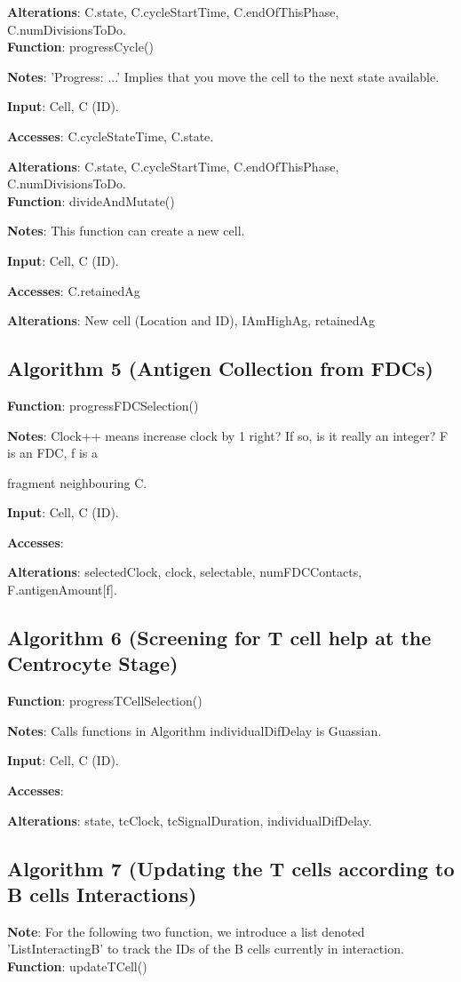 \documentclass[english]{article}
\begin{document}
\textbf{Alterations}: C.state, C.cycleStartTime, C.endOfThisPhase, C.numDivisionsToDo. 
\\
\textbf{Function}: progressCycle()

\textbf{Notes}: 'Progress: ...' Implies that you move the cell to the next state available. 

\textbf{Input}: Cell, C (ID). 

\textbf{Accesses}: C.cycleStateTime, C.state. 

\textbf{Alterations}: C.state, C.cycleStartTime, C.endOfThisPhase, C.numDivisionsToDo. 
\\
\textbf{Function}: divideAndMutate()

\textbf{Notes}: This function can create a new cell. 

\textbf{Input}: Cell, C (ID). 

\textbf{Accesses}: C.retainedAg

\textbf{Alterations}: New cell (Location and ID), IAmHighAg, retainedAg

\subsection{Algorithm 5 (Antigen Collection from FDCs)}
\textbf{Function}: progressFDCSelection()

\textbf{Notes}: Clock++ means increase clock by 1 right? If so, is it really an integer? F is an FDC, f is a 

fragment neighbouring C. 

\textbf{Input}: Cell, C (ID). 

\textbf{Accesses}: 

\textbf{Alterations}: selectedClock, clock, selectable, numFDCContacts,  F.antigenAmount[f]. 

\subsection{Algorithm 6 (Screening for T cell help at the Centrocyte Stage)}
\textbf{Function}: progressTCellSelection()

\textbf{Notes}: Calls functions in Algorithm individualDifDelay is Guassian.

\textbf{Input}: Cell, C (ID). 

\textbf{Accesses}:

\textbf{Alterations}: state, tcClock, tcSignalDuration, individualDifDelay.

\subsection{Algorithm 7 (Updating the T cells according to B cells Interactions)}
\textbf{Note}: For the following two function, we introduce a list denoted 'ListInteractingB' to track the IDs of the B cells currently in interaction.
\\
\textbf{Function}: updateTCell()
\end{document}

